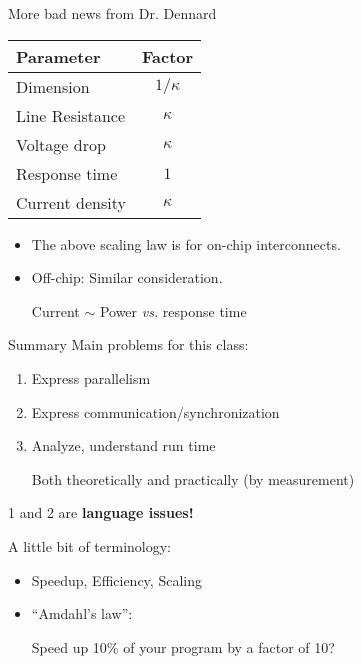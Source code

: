 \documentclass[english,compress]{beamer}
\begin{document}
\begin{frame}{More bad news from Dr. Dennard}
  \begin{center}
    \begin{tabular}{l|c}
      \textbf{Parameter} & \textbf{Factor} \\
      \hline
      Dimension & $1/\kappa$ \\
      Line Resistance & $\kappa$ \\
      Voltage drop & $\kappa$ \\
      Response time & $1$ \\
      Current density & $\kappa$
    \end{tabular}

  \end{center}
  \begin{itemize}
    \item The above scaling law is for on-chip interconnects.
    \item Off-chip: Similar consideration.

      Current $\sim $ Power \; \emph{vs.}\; response time
  \end{itemize}
\end{frame}
\begin{frame}{Summary}
  Main problems for this class:
  \begin{enumerate}
    \item Express parallelism
    \item Express communication/synchronization
    \item Analyze, understand run time

      Both theoretically and practically (by measurement)
  \end{enumerate}
  1 and 2 are \textbf{language issues!}

  \pause
  \bigskip
  A little bit of terminology:
  \begin{itemize}
    \item Speedup, Efficiency, Scaling
    \item ``Amdahl's law'':

      Speed up 10\% of your program by a factor of 10?
  \end{itemize}
\end{frame}
\end{document}
